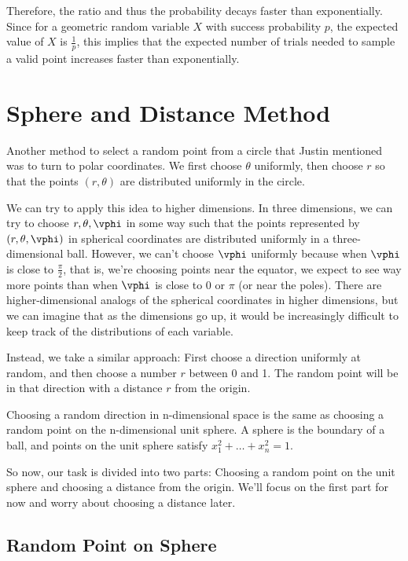 \documentclass{article}
\begin{document}
Therefore, the ratio and thus the probability decays faster than exponentially. Since for a geometric random variable $X$ with success probability $p$, the expected value of $X$ is $\frac{1}{p}$, this implies that the expected number of trials needed to sample a valid point increases faster than exponentially.

\section{Sphere and Distance Method}

Another method to select a random point from a circle that Justin mentioned was to turn to polar coordinates. We first choose $\theta$ uniformly, then choose $r$ so that the points $(r, \theta)$ are distributed uniformly in the circle.

We can try to apply this idea to higher dimensions. In three dimensions, we can try to choose $r, \theta, \vphi$ in some way such that the points represented by $(r, \theta, \vphi)$ in spherical coordinates are distributed uniformly in a three-dimensional ball. However, we can't choose $\vphi$ uniformly because when $\vphi$ is close to $\frac{\pi}{2}$, that is, we're choosing points near the equator, we expect to see way more points than when $\vphi$ is close to 0 or $\pi$ (or near the poles). There are higher-dimensional analogs of the spherical coordinates in higher dimensions, but we can imagine that as the dimensions go up, it would be increasingly difficult to keep track of the distributions of each variable.

Instead, we take a similar approach: First choose a direction uniformly at random, and then choose a number $r$ between 0 and 1. The random point will be in that direction with a distance $r$ from the origin.

Choosing a random direction in n-dimensional space is the same as choosing a random point on the n-dimensional unit sphere. A sphere is the boundary of a ball, and points on the unit sphere satisfy $x_1^2 + \ldots + x_n^2 = 1$.

So now, our task is divided into two parts: Choosing a random point on the unit sphere and choosing a distance from the origin. We'll focus on the first part for now and worry about choosing a distance later.

\subsection{Random Point on Sphere}
\end{document}
